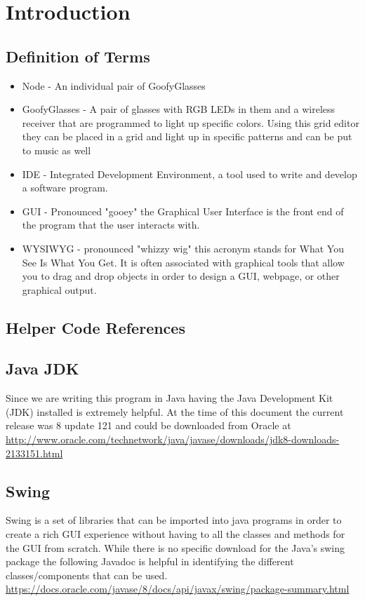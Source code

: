 \documentclass[letterpaper,12pt]{article}
\begin{document}
	\section*{Introduction}
	\subsection*{Definition of Terms}
	\begin{itemize}
		\item Node - An individual pair of GoofyGlasses
		\item GoofyGlasses - A pair of glasses with RGB LEDs in them and a wireless receiver that are programmed to light up specific colors. Using this grid editor they can be placed in a grid and light up in specific patterns and can be put to music as well
		\item IDE - Integrated Development Environment, a tool used to write and develop a software program.
		\item GUI - Pronounced "gooey" the Graphical User Interface is the front end of the program that the user interacts with.
		\item WYSIWYG - pronounced "whizzy wig" this acronym stands for What You See Is What You Get. It is often associated with graphical tools that allow you to drag and drop objects in order to design a GUI, webpage, or other graphical output. 
		
	\end{itemize}
	\subsection*{Helper Code References}
	\subsection*{Java JDK}
		Since we are writing this program in Java having the Java Development Kit (JDK) installed is extremely helpful. At the time of this document the current release was 8 update 121 and could be downloaded from Oracle at \url{http://www.oracle.com/technetwork/java/javase/downloads/jdk8-downloads-2133151.html}
		
	\subsection*{Swing}
		Swing is a set of libraries that can be imported into java programs in order to create a rich GUI experience without having to all the classes and methods for the GUI from scratch. While there is no specific download for the Java's swing package the following Javadoc is helpful in identifying the different classes/components that can be used. \url{https://docs.oracle.com/javase/8/docs/api/javax/swing/package-summary.html}
		
\end{document}
